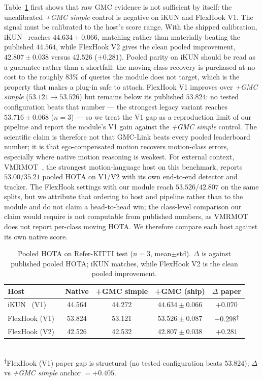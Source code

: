 \documentclass[sigconf,anonymous,nonacm]{acmart}
\begin{document}
Table~\ref{tab:main} first shows that raw GMC evidence is not sufficient by itself: the uncalibrated \emph{+GMC simple} control is negative on iKUN and FlexHook V1. The signal must be calibrated to the host's score range. With the shipped calibration, iKUN~\cite{ikun} reaches $44.634 \pm 0.066$, matching rather than materially beating the published $44.564$, while FlexHook V2 gives the clean pooled improvement, $42.807 \pm 0.038$ versus $42.526$ ($+0.281$). Pooled parity on iKUN should be read as a guarantee rather than a shortfall: the moving-class recovery is purchased at no cost to the roughly $83\%$ of queries the module does not target, which is the property that makes a plug-in safe to attach. FlexHook V1 improves over \emph{+GMC simple} ($53.121 \to 53.526$) but remains below its published $53.824$: no tested configuration beats that number --- the strongest legacy variant reaches $53.716 \pm 0.068$ ($n{=}3$) --- so we treat the V1 gap as a reproduction limit of our pipeline and report the module's V1 gain against the \emph{+GMC simple} control. The scientific claim is therefore not that GMC-Link beats every pooled leaderboard number; it is that ego-compensated motion recovers motion-class errors, especially where native motion reasoning is weakest. For external context, VMRMOT~\cite{vmrmot}, the strongest motion-language host on this benchmark, reports $53.00$/$35.21$ pooled HOTA on V1/V2 with its own end-to-end detector and tracker. The FlexHook settings with our module reach $53.526$/$42.807$ on the same splits, but we attribute that ordering to host and pipeline rather than to the module and do not claim a head-to-head win; the class-level comparison our claim would require is not computable from published numbers, as VMRMOT does not report per-class moving HOTA. We therefore compare each host against its own native score.

\begin{table}[t]
\centering
\caption{Pooled HOTA on Refer-KITTI test ($n{=}3$, mean$\pm$std). $\Delta$ is against published pooled HOTA; iKUN matches, while FlexHook V2 is the clean pooled improvement.}
\label{tab:main}
\small
\setlength{\tabcolsep}{4pt}
\begin{tabular}{lcccc}
\toprule
Host & Native & +GMC simple & +GMC (ship) & $\Delta$ paper \\
\midrule
iKUN~\cite{ikun} (V1)        & 44.564 & 44.272 & $44.634 \pm 0.066$ & $+0.070$ \\
FlexHook (V1)~\cite{flexhook}  & 53.824 & 53.121 & $53.526 \pm 0.087$ & $-0.298$\textsuperscript{$\dagger$} \\
FlexHook (V2)~\cite{flexhook}  & 42.526 & 42.532 & $42.807 \pm 0.038$ & $+0.281$ \\
\bottomrule
\end{tabular}
\\[2pt]
{\footnotesize \textsuperscript{$\dagger$}FlexHook (V1) paper gap is structural (no tested configuration beats $53.824$); $\Delta$ vs \emph{+GMC simple} anchor $= +0.405$.}
\end{table}
\end{document}
